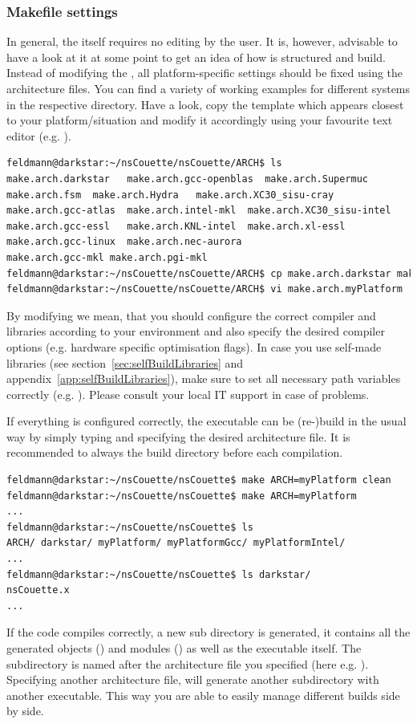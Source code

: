 \documentclass[a4paper, 11pt, DIV=11]{scrartcl}
\begin{document}
\subsubsection{Makefile settings}
\label{sec:makefile}

In general, the  itself requires no editing by the user.
It is, however, advisable to have a look at it at some point to get an
idea of how \nsc is structured and build. Instead of modifying the
, all platform-specific settings should be fixed using
the architecture files. You can find a variety of working examples for
different systems in the respective directory. Have a look, copy the
template which appears closest to your platform/situation and modify it
accordingly using your favourite text editor (e.g. ).
\begin{lstlisting}[language=bash]
feldmann@darkstar:~/nsCouette/nsCouette/ARCH$ ls
make.arch.darkstar   make.arch.gcc-openblas  make.arch.Supermuc
make.arch.fsm  make.arch.Hydra   make.arch.XC30_sisu-cray
make.arch.gcc-atlas  make.arch.intel-mkl  make.arch.XC30_sisu-intel
make.arch.gcc-essl   make.arch.KNL-intel  make.arch.xl-essl
make.arch.gcc-linux  make.arch.nec-aurora
make.arch.gcc-mkl make.arch.pgi-mkl
feldmann@darkstar:~/nsCouette/nsCouette/ARCH$ cp make.arch.darkstar make.arch.myPlatform
feldmann@darkstar:~/nsCouette/nsCouette/ARCH$ vi make.arch.myPlatform
\end{lstlisting}
By modifying we mean, that you should configure the correct compiler and libraries 
according to your environment and also specify the desired compiler options (e.g.
hardware specific optimisation flags). In case you use self-made libraries (see 
section~\ref{sec:selfBuildLibraries} and appendix~\ref{app:selfBuildLibraries}),
make sure to set all necessary path variables correctly (e.g. ).
Please consult your local IT support in case of problems. 
\par
If everything is configured correctly, the executable can be (re-)build in the usual way by
simply typing  and specifying the desired architecture file. It is recommended 
to always  the build directory before each compilation. 
\begin{lstlisting}[language=bash]
feldmann@darkstar:~/nsCouette/nsCouette$ make ARCH=myPlatform clean
feldmann@darkstar:~/nsCouette/nsCouette$ make ARCH=myPlatform
...
feldmann@darkstar:~/nsCouette/nsCouette$ ls
ARCH/ darkstar/ myPlatform/ myPlatformGcc/ myPlatformIntel/
...
feldmann@darkstar:~/nsCouette/nsCouette$ ls darkstar/
nsCouette.x
...
\end{lstlisting}
If the code compiles correctly, a new sub directory is generated, it contains all the 
generated objects () and modules () as well as the executable 
 itself. The subdirectory is named after the architecture file you 
specified (here e.g. ). Specifying another architecture file, will
generate another subdirectory with another executable. This way you are able to easily 
manage different builds side by side. 
\end{document}
